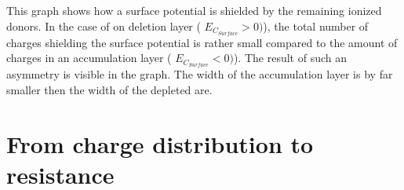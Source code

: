 \documentclass[11pt]{article}
\begin{document}
    \begin{Verbatim}[commandchars=\\\{\}]





    \end{Verbatim}

    \begin{center}
    \end{center}
    { \hspace*{\fill} \\}
    
    \begin{Verbatim}[commandchars=\\\{\}]





    \end{Verbatim}

    \begin{center}
    \end{center}
    { \hspace*{\fill} \\}
    
    \begin{Verbatim}[commandchars=\\\{\}]





    \end{Verbatim}

    This graph shows how a surface potential is shielded by the remaining
ionized donors. In the case of on deletion layer (
\(E_{C_{Surface}}>0 )\)), the total number of charges shielding the
surface potential is rather small compared to the amount of charges in
an accumulation layer ( \(E_{C_{Surface}}<0 )\)). The result of such an
asymmetry is visible in the graph. The width of the accumulation layer
is by far smaller then the width of the depleted are.

    \hypertarget{from-charge-distribution-to-resistance}{%
\section{From charge distribution to
resistance}\label{from-charge-distribution-to-resistance}}
\end{document}
